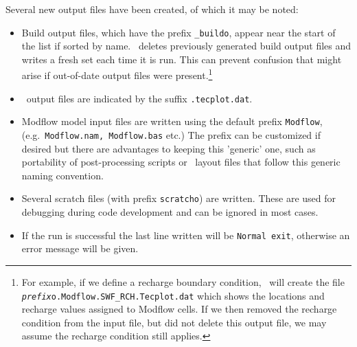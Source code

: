 Several new output files have been created, of which it may be noted:
\begin{itemize}
    \item Build output files, which have the prefix \texttt{\_buildo}, appear near the start of the list if sorted by name. \mut\ deletes previously generated build output files and writes a fresh set each time it is run.  This can prevent confusion that might arise if out-of-date output files were present.\footnote{For example, if we define a recharge boundary condition, \mut\ will create the file \texttt{\textit{prefix}o.Modflow.SWF\_RCH.Tecplot.dat} which shows the locations and recharge values assigned to Modflow cells.  If we then removed the recharge condition from the input file, but did not delete this output file, we may assume the recharge condition still applies.}
    \item \tecplot\ output files are indicated by the suffix \texttt{.tecplot.dat}.
    \item Modflow model input files are written using the default prefix \texttt{Modflow}, (e.g.\ \texttt{Modflow.nam, Modflow.bas} etc.)  The prefix can be customized if desired but there are advantages to keeping this 'generic' one, such as portability of post-processing scripts or \tecplot\ layout files that follow this generic naming convention.
    \item Several scratch files (with prefix \texttt{scratcho}) are written. These are used for debugging during code development and can be ignored in most cases.
    \item If the run is successful the last line written will be \texttt{Normal exit}, otherwise an error message will be given.
\end{itemize}

